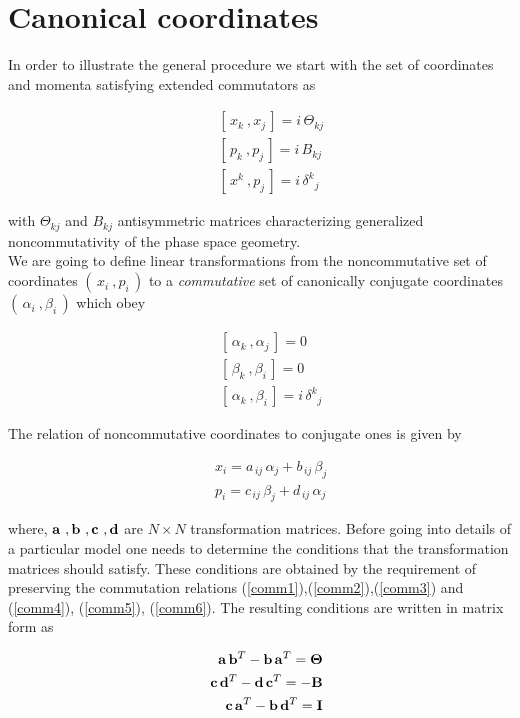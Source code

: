 \documentclass[a4paper,aps,prd,preprint]{revtex4}
\begin{document}
\section{Canonical coordinates}
In order to illustrate the general procedure we start with
the set of coordinates and momenta satisfying extended commutators as 
\cite{uno}

 \begin{eqnarray}
&&\left[\, x_k\ , x_j\,\right]=i\,\Theta_{kj}\label{comm1}\\
&&\left[\, p_k\ , p_j\,\right]=i\,B_{kj}\label{comm2}\\
&&\left[\, x^k\ , p_j\,\right]=i\,\delta^k{}_j\label{comm3}
\end{eqnarray}

with $\Theta_{kj}$ and $B_{kj}$ antisymmetric matrices characterizing
generalized noncommutativity of the phase space geometry.\\
We are  going to define  linear transformations 
from the noncommutative set of coordinates $\left(\, x_i\ , p_i\,\right)$ to a 
{\it commutative} set of canonically conjugate coordinates  
$\left(\, \alpha_i\ , \beta_i\,\right)$ which obey

\begin{eqnarray}
&&\left[\, \alpha_k\ , \alpha_j\,\right]=0\label{comm4}\\
&&\left[\,\beta_k\ ,\beta_i  \,\right]=0\label{comm5}\\
&&\left[\,\alpha_k \ ,\beta_i \,\right]=i\,\delta^k{}_j\label{comm6}
\end{eqnarray}

The relation of noncommutative coordinates to conjugate ones is given by

\begin{eqnarray}
&& x_i= a_{\, ij}\, \alpha_j + b_{\, ij}\, \beta_j \label{t1} \\
&& p_i= c_{\, ij}\, \beta_j + d_{\, ij}\, \alpha_j\label{t2}
\end{eqnarray}

where, ${\bf a}\ , {\bf b}\ ,{\bf c}\ ,{\bf d}$ are 
$N\times N$ transformation matrices. 
Before going into details of a particular model one needs to determine the 
conditions that the transformation matrices should satisfy. These 
conditions are obtained by the requirement of preserving the commutation
relations (\ref{comm1}),(\ref{comm2}),(\ref{comm3}) and (\ref{comm4}),
(\ref{comm5}), (\ref{comm6}). The resulting conditions are written in matrix 
form as
 
 \begin{eqnarray}
&& {\bf a}\, {\bf b}^T -{\bf b}\,{\bf a}^T = {\bf \Theta} \label{m1}\\
&& {\bf c}\, {\bf d}^T -{\bf d}\,{\bf c}^T = -{\bf B}\label{m2}\\
&& {\bf c}\, {\bf a}^T -{\bf b}\,{\bf d}^T = {\bf I}\label{m3}
\end{eqnarray}
\end{document}
